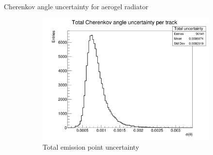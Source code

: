 \documentclass{beamer}
\begin{document}
\begin{frame}{Cherenkov angle uncertainty for aerogel radiator}
\begin{figure}
    \begin{subfigure}{0.35\textwidth}
      \includegraphics[width = 1.0\textwidth]{Plots/TotalCherenkovUncertainty_Barrel_Aerogel.png}
      \caption{Total emission point uncertainty}
    \end{subfigure}
    \caption{}
  \end{figure}
\end{frame}
\end{document}
